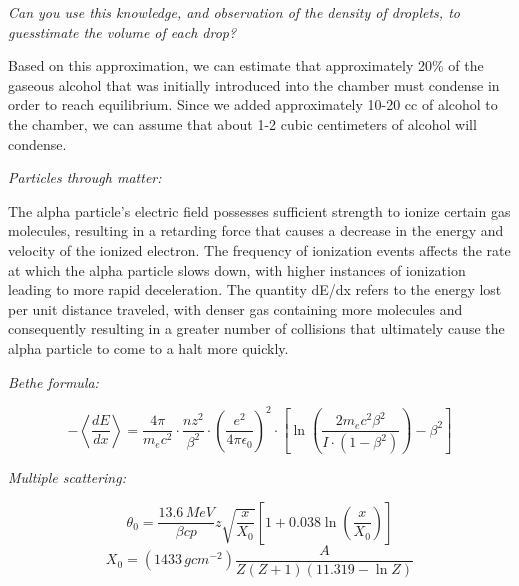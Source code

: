 \documentclass[a4paper]{tufte-handout}
\begin{document}
\hrulefill

\textit{Can you use this knowledge, and observation of the density of droplets, to guesstimate the volume of each drop?}

Based on this approximation, we can estimate that approximately 20\% of the gaseous alcohol that was initially introduced into the chamber must condense in order to reach equilibrium. Since we added approximately 10-20 cc of alcohol to the chamber, we can assume that about 1-2 cubic centimeters of alcohol will condense.

\hrulefill

\textit{Particles through matter:}

The alpha particle's electric field possesses sufficient strength to ionize certain gas molecules, resulting in a retarding force that causes a decrease in the energy and velocity of the ionized electron. The frequency of ionization events affects the rate at which the alpha particle slows down, with higher instances of ionization leading to more rapid deceleration. The quantity dE/dx refers to the energy lost per unit distance traveled, with denser gas containing more molecules and consequently resulting in a greater number of collisions that ultimately cause the alpha particle to come to a halt more quickly.

\hrulefill

\textit{Bethe formula:}

$$-\left<\frac{dE}{dx}\right> = \frac{4\pi}{m_ec^2}\cdot\frac{nz^2}{\beta^2}\cdot\left(\frac{e^2}{4\pi\epsilon_0}\right)^2\cdot\left[\ln\left(\frac{2m_ec^2\beta^2}{I\cdot(1-\beta^2)}\right)-\beta^2\right]$$

\hrulefill

\textit{Multiple scattering:}

$$\theta_0 = \frac{13.6 \,\si{MeV}}{\beta cp}z \sqrt{\frac{x}{X_0}}\left[1+0.038\ln{\left(\frac{x}{X_0}\right)}\right]$$
$$X_0 = (1433 \,\si{g cm^{-2}})\frac{A}{Z(Z+1)(11.319-\ln{Z})}$$
\hrulefill

\newpage

\end{document}
